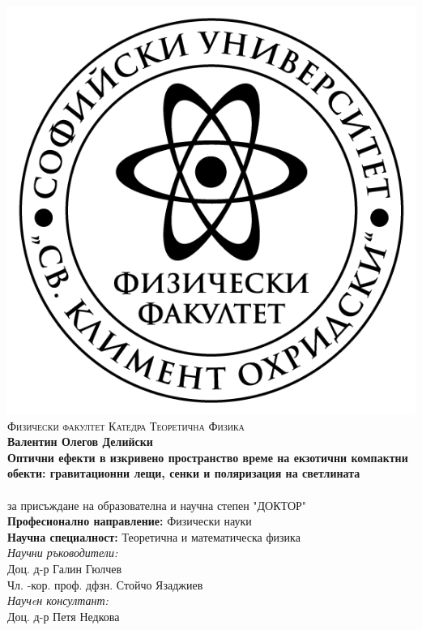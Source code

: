 
\thispagestyle{empty}
\begin{center}

		\centering
		\includegraphics[scale = 1]{logo-FzF.png}
		\noindent\makebox[\linewidth]{\rule{15cm}{0.8pt}}
		\textsc{Физически факултет}
		\noindent\makebox[\linewidth]{\rule{15cm}{0.8pt}}
		\textsc{Катедра Теоретична	 Физика}\\
		\bigskip
		\bigskip
		\bigskip
		\bigskip
		{\Large{\textbf{Валентин Олегов Делийски}}}\\
		\bigskip
		\bigskip
		\bigskip
		{\Large \textbf{Оптични ефекти в изкривено пространство време на екзотични компактни обекти: гравитационни лещи, сенки и поляризация на светлината}}\\
		\bigskip
		\bigskip
		\bigskip
		{\textbf{\huge {}}}\\
		\bigskip
		за присъждане на образователна и научна степен "ДОКТОР"\\
		\bigskip
		\bigskip
		\bigskip
		\textbf{Професионално направление:} Физически науки\\
		\textbf{Научна специалност:} Теоретична и математическа физика\\
		\bigskip
		\bigskip
		\bigskip
		\bigskip
		\textit{Научни ръководители:}\\
		Доц. д-р Галин Гюлчев\\
		\bigskip
		Чл. -кор. проф. дфзн. Стойчо Язаджиев\\
		\bigskip
		\textit{Научeн консултант:}\\
		Доц. д-р Петя Недкова\\
		

\end{center}

	